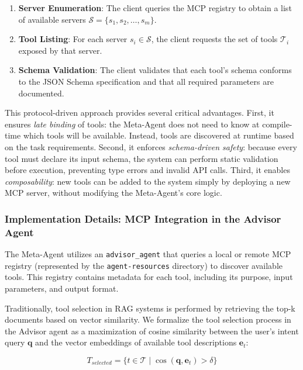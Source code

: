 \documentclass[lettersize,journal]{IEEEtran}
\begin{document}
\begin{enumerate}
    \item \textbf{Server Enumeration}: The client queries the MCP registry to obtain a list of available servers $\mathcal{S} = \{s_1, s_2, \ldots, s_m\}$.
    \item \textbf{Tool Listing}: For each server $s_i \in \mathcal{S}$, the client requests the set of tools $\mathcal{T}_i$ exposed by that server.
    \item \textbf{Schema Validation}: The client validates that each tool's schema conforms to the JSON Schema specification and that all required parameters are documented.
\end{enumerate}

This protocol-driven approach provides several critical advantages. First, it ensures \textit{late binding} of tools: the Meta-Agent does not need to know at compile-time which tools will be available. Instead, tools are discovered at runtime based on the task requirements. Second, it enforces \textit{schema-driven safety}: because every tool must declare its input schema, the system can perform static validation before execution, preventing type errors and invalid API calls. Third, it enables \textit{composability}: new tools can be added to the system simply by deploying a new MCP server, without modifying the Meta-Agent's core logic.

\subsubsection{Implementation Details: MCP Integration in the Advisor Agent}
The Meta-Agent utilizes an \texttt{advisor\_agent} that queries a local or remote MCP registry (represented by the \texttt{agent-resources} directory) to discover available tools. This registry contains metadata for each tool, including its purpose, input parameters, and output format.


Traditionally, tool selection in RAG systems is performed by retrieving the top-k documents based on vector similarity. We formalize the tool selection process in the Advisor agent as a maximization of cosine similarity between the user's intent query $\mathbf{q}$ and the vector embeddings of available tool descriptions $\mathbf{e}_t$:

\begin{equation}
\label{eq:tool_select}
T_{selected} = \{ t \in \mathcal{T} \mid \cos(\mathbf{q}, \mathbf{e}_t) > \delta \}
\end{equation}
\end{document}
